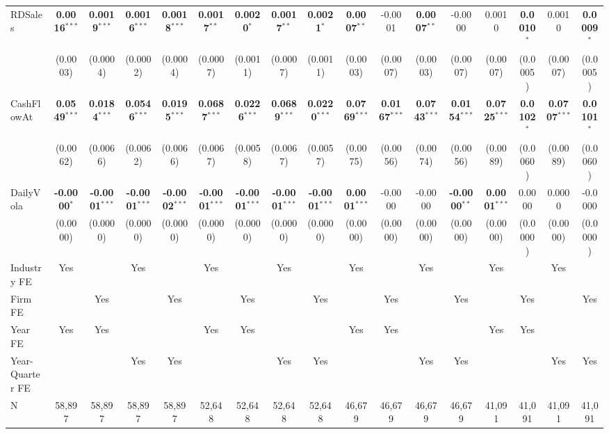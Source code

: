 \begin{landscape}
\begin{table}[H]
\begin{tabular}{lcccccccccccccccc}
RDSales & \textbf{0.0016}$^{***}$ & \textbf{0.0019}$^{***}$ & \textbf{0.0016}$^{***}$ & \textbf{0.0018}$^{***}$ & \textbf{0.0017}$^{**}$ & \textbf{0.0020}$^{*}$ & \textbf{0.0017}$^{**}$ & \textbf{0.0021}$^{*}$ & \textbf{0.0007}$^{**}$ & -0.0001 & \textbf{0.0007}$^{**}$ & -0.0000 & 0.0010 & \textbf{0.0010}$^{*}$ & 0.0010 & \textbf{0.0009}$^{*}$ \\
 & (0.0003) & (0.0004) & (0.0002) & (0.0004) & (0.0007) & (0.0011) & (0.0007) & (0.0011) & (0.0003) & (0.0007) & (0.0003) & (0.0007) & (0.0007) & (0.0005) & (0.0007) & (0.0005) \\
CashFlowAt & \textbf{0.0549}$^{***}$ & \textbf{0.0184}$^{***}$ & \textbf{0.0546}$^{***}$ & \textbf{0.0195}$^{***}$ & \textbf{0.0687}$^{***}$ & \textbf{0.0226}$^{***}$ & \textbf{0.0689}$^{***}$ & \textbf{0.0220}$^{***}$ & \textbf{0.0769}$^{***}$ & \textbf{0.0167}$^{***}$ & \textbf{0.0743}$^{***}$ & \textbf{0.0154}$^{***}$ & \textbf{0.0725}$^{***}$ & \textbf{0.0102}$^{*}$ & \textbf{0.0707}$^{***}$ & \textbf{0.0101}$^{*}$ \\
 & (0.0062) & (0.0066) & (0.0062) & (0.0066) & (0.0067) & (0.0058) & (0.0067) & (0.0057) & (0.0075) & (0.0056) & (0.0074) & (0.0056) & (0.0089) & (0.0060) & (0.0089) & (0.0060) \\
DailyVola & \textbf{-0.0000}$^{*}$ & \textbf{-0.0001}$^{***}$ & \textbf{-0.0001}$^{***}$ & \textbf{-0.0002}$^{***}$ & \textbf{-0.0001}$^{***}$ & \textbf{-0.0001}$^{***}$ & \textbf{-0.0001}$^{***}$ & \textbf{-0.0001}$^{***}$ & \textbf{0.0001}$^{***}$ & -0.0000 & -0.0000 & \textbf{-0.0000}$^{**}$ & \textbf{0.0001}$^{***}$ & 0.0000 & 0.0000 & -0.0000 \\
 & (0.0000) & (0.0000) & (0.0000) & (0.0000) & (0.0000) & (0.0000) & (0.0000) & (0.0000) & (0.0000) & (0.0000) & (0.0000) & (0.0000) & (0.0000) & (0.0000) & (0.0000) & (0.0000) \\
\midrule
Industry FE & Yes &  & Yes &  & Yes &  & Yes &  & Yes &  & Yes &  & Yes &  & Yes &  \\
Firm FE &  & Yes &  & Yes &  & Yes &  & Yes &  & Yes &  & Yes &  & Yes &  & Yes \\
Year FE & Yes & Yes &  &  & Yes & Yes &  &  & Yes & Yes &  &  & Yes & Yes &  &  \\
Year-Quarter FE &  &  & Yes & Yes &  &  & Yes & Yes &  &  & Yes & Yes &  &  & Yes & Yes \\
\midrule
N & 58,897 & 58,897 & 58,897 & 58,897 & 52,648 & 52,648 & 52,648 & 52,648 & 46,679 & 46,679 & 46,679 & 46,679 & 41,091 & 41,091 & 41,091 & 41,091 \\

\end{tabular}
\end{table}
\end{landscape}
